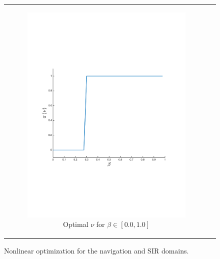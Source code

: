 {\begin{figure}[ht]
\begin{tabular}{cc}
            \begin{subfigure}{0.2\textwidth}\centering\includegraphics[width=\textwidth]{images/sir_opt_new}\caption{Optimal {\footnotesize $ \nu $} for {\footnotesize $ \beta \in \left[ 0.0, 1.0 \right] $}}\label{fig:sir_opt}\end{subfigure}
            \\
        \end{tabular}
        \caption{Nonlinear optimization for the navigation and SIR domains.}        
        \label{tab:opt_results}
        \vspace{-3mm}
    \end{figure}
}

